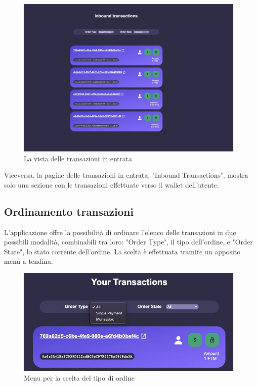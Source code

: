 \begin{figure}[H]
    \centering
    \includegraphics[scale=0.4]{immagini/inboundtransactions.jpg}
    \caption{La vista delle transazioni in entrata}
\end{figure}

Viceversa, la pagine delle transazioni in entrata, "Inbound Transactions", mostra solo una sezione con le transazioni effettuate verso il wallet dell'utente.

\subsection{Ordinamento transazioni}

L'applicazione offre la possibilità di ordinare l'elenco delle transazioni in due possibili modalità, combinabili tra loro: 
"Order Type", il tipo dell'ordine, e "Order State", lo stato corrente dell'ordine.
La scelta è effettuata tramite un apposito menu a tendina.

\begin{figure}[H]
    \centering
    \includegraphics[scale=0.4]{immagini/ordertype.jpg}
    \caption{Menu per la scelta del tipo di ordine}
\end{figure}


